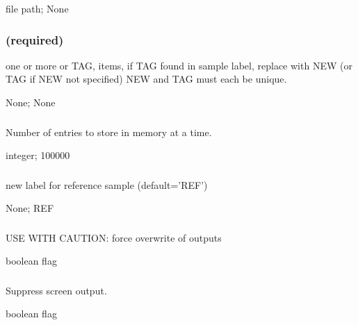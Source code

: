 \documentclass[letterpaper,11pt,english]{sphinxmanual}
\begin{document}
 file path;  None


\subsubsection{ (required)}
\label{\detokenize{prog_desc:sample-tags-sampletags-required}}
 one or more  or TAG, items, if TAG found in sample label, replace with NEW (or TAG if NEW not specified) NEW and TAG must each be unique.

 None;  None


\subsubsection{}
\label{\detokenize{prog_desc:id11}}
 Number of entries to store in memory at a time.

 integer;  100000


\subsubsection{}
\label{\detokenize{prog_desc:mvf-ref-label-mvfreflabel}}
 new label for reference sample (default=’REF’)

 None;  REF


\subsubsection{}
\label{\detokenize{prog_desc:id12}}
 USE WITH CAUTION: force overwrite of outputs

 boolean flag


\subsubsection{}
\label{\detokenize{prog_desc:id13}}
 Suppress screen output.

 boolean flag
\end{document}
